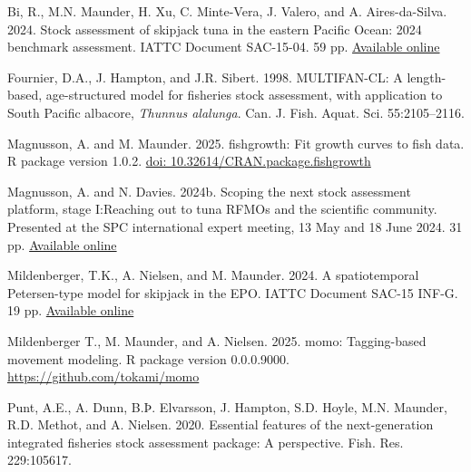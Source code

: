 \documentclass{SCreport}
\newcommand\blob
{https://github.com/PacificCommunity/ofp-sam-transition-plan/blob/main}
\newcommand\present{\blob/presentations}
\begin{document}
\begin{description}\setlength\itemsep{0ex}
  \item Bi, R., M.N. Maunder, H. Xu, C. Minte-Vera, J. Valero, and A.
  Aires-da-Silva. 2024. Stock assessment of skipjack tuna in the eastern Pacific
  Ocean: 2024 benchmark assessment. IATTC Document SAC-15-04. 59 pp.
  \href{https://www.iattc.org/GetAttachment/f57dece1-81ba-4771-8fa8-3362320a368%
    a/SAC-15-04_Skipjack-tuna-benchmark-assessment-2024.pdf}{Available online}
  \item Fournier, D.A., J. Hampton, and J.R. Sibert. 1998. MULTIFAN-CL: A
  length-based, age-structured model for fisheries stock assessment, with
  application to South Pacific albacore, \textit{Thunnus alalunga}. Can. J.
  Fish. Aquat. Sci. 55:2105--2116.
  \item Magnusson, A. and M. Maunder. 2025. fishgrowth: Fit growth curves to
  fish data. R package version 1.0.2.
  \href{https://doi.org/10.32614/CRAN.package.fishgrowth}
  {doi: 10.32614/CRAN.package.fishgrowth}
  \item Magnusson, A. and N. Davies. 2024b. Scoping the next stock assessment
  platform, stage I:\linebreak Reaching out to tuna RFMOs and the scientific
  community. Presented at the SPC international expert meeting, 13 May and 18
  June 2024. 31 pp.
  \href{\present/2024_05_13_experts_scoping/2024_05_13_experts_scoping.pdf}
  {Available online}
  \item Mildenberger, T.K., A. Nielsen, and M. Maunder. 2024. A spatiotemporal
  Petersen-type model for skipjack in the EPO. IATTC Document SAC-15 INF-G. 19
  pp. \href{https://www.iattc.org/GetAttachment/f8eacbc8-92b8-434d-a331-bdc733d%
    c1bc6/SAC-15-INF-G_Spatiotemporal-tagging-model-for-skipjack-in-the-EPO.pdf}
  {Available online}
  \item Mildenberger T., M. Maunder, and A. Nielsen. 2025. momo: Tagging-based
  movement modeling. R package version 0.0.0.9000.
  \href{https://github.com/tokami/momo}{https://github.com/tokami/momo}
  \item Punt, A.E., A. Dunn, B.Þ. Elvarsson, J. Hampton, S.D. Hoyle, M.N.
  Maunder, R.D. Methot, and A. Nielsen. 2020. Essential features of the
  next-generation integrated fisheries stock assessment package: A perspective.
  Fish. Res. 229:105617.
\end{description}

\newpage

\appendix
\end{document}
